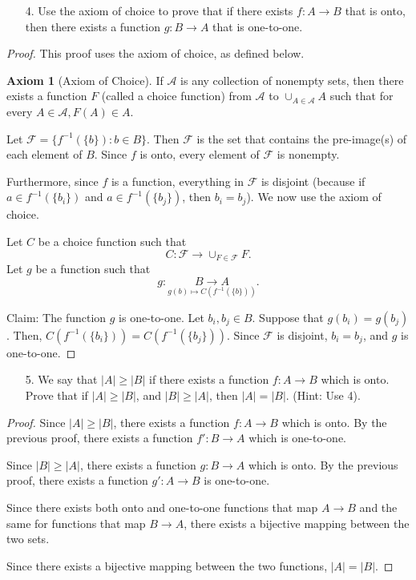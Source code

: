 \documentclass[10pt]{article}
\theoremstyle{definition}
\newtheorem{axiom}[equation]{Axiom}
\theoremstyle{plain}
\begin{document}
\pagebreak



\begin{enumerate}
\item[4.] Use the axiom of choice to prove that if there exists $f:A \to B$ that is onto, then there exists a function $g:B \to A$ that is one-to-one.
\end{enumerate}

\begin{proof}
This proof uses the axiom of choice, as defined below.

\begin{axiom}[Axiom of Choice]
  If $\mathscr{A}$ is any collection of nonempty sets, then there exists a function $F$ (called a choice function) from $\mathscr{A}$ to $\cup_{A\in\mathscr{A}} A$ such that for every $A\in\mathscr{A}, F(A)\in A.$
\end{axiom}

Let $\mathcal{F}=\{f^{-1}(\{b\}):b\in B\}.$ Then $\mathcal{F}$ is the set that contains the pre-image(s) of each element of $B$. Since $f$ is onto, every element of $\mathcal{F}$ is nonempty.

Furthermore, since $f$ is a function, everything in $\mathcal{F}$ is disjoint (because if $a\in f^{-1}(\{b_i\})$ and $a\in f^{-1}(\{b_j\})$, then $b_i=b_j$). We now use the axiom of choice.

Let $C$ be a choice function such that
$$C:\mathcal{F}\to \cup_{F\in\mathcal{F}} F.$$
Let $g$ be a function such that
$$g:\underset{g(b) \mapsto C(f^{-1}(\{b\}))}{B \to A}.$$

Claim: The function $g$ is one-to-one.
Let $b_i, b_j\in B$. Suppose that $g(b_i)=g(b_j)$. Then, $C(f^{-1}(\{b_i\})) = C(f^{-1}(\{b_j\}))$. Since $\mathcal{F}$ is disjoint, $b_i=b_j$, and $g$ is one-to-one.
\end{proof}




\pagebreak




\begin{enumerate}
\item[5.] We say that $|A| \geq |B|$ if there exists a function $f:A \to B$ which is onto.  Prove that if $|A| \geq |B|$, and $|B| \geq |A|$, then $|A| = |B|$.  (Hint:  Use 4).
\end{enumerate}

\begin{proof}
  Since $|A| \geq |B|$, there exists a function $f:A\to B$ which is onto. By the previous proof, there exists a function $f':B\to A$ which is one-to-one.

  Since $|B| \geq |A|$, there exists a function $g:B\to A$ which is onto. By the previous proof, there exists a function $g':A\to B$ is one-to-one.

  Since there exists both onto and one-to-one functions that map $A\to B$ and the same for functions that map $B\to A$, there exists a bijective mapping between the two sets.

  Since there exists a bijective mapping between the two functions, $|A| = |B|$.
\end{proof}
\end{document}
